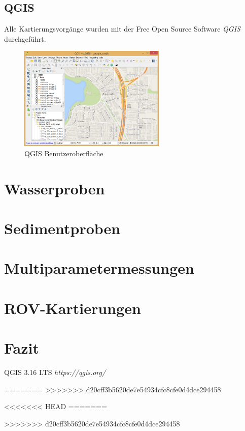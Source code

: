 \documentclass[12pt,titlepage]{scrreprt}
\begin{document}
    \subsection*{QGIS}
    Alle Kartierungsvorgänge wurden mit der Free Open Source Software \emph{QGIS}\cite{qgis} durchgeführt.
    \begin{figure}[h]
        \centering
        \includegraphics[width=7cm]{QGIS/about-screenshot.png}
        \caption{QGIS Benutzeroberfläche}
        \label{fig:qgis_scr0}
    \end{figure}
\section{Wasserproben}
\section{Sedimentproben}
\section{Multiparametermessungen}
\section{ROV-Kartierungen}
\section{Fazit}

\begin{thebibliography}{9}
QGIS 3.16 LTS
\textit{https://qgis.org/}
\end{thebibliography}

=======
>>>>>>> d20cff3b5620de7e54934cfc8cfe0d4dce294458






<<<<<<< HEAD
=======

>>>>>>> d20cff3b5620de7e54934cfc8cfe0d4dce294458
\end{document}
